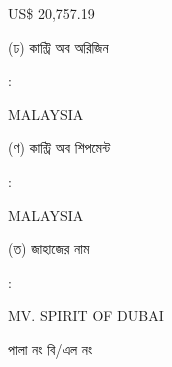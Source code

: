 \documentclass[12pt]{article}
\newcommand{\price}{US\$ 20,757.19}
\newcommand{\co}{MALAYSIA}
\newcommand{\coship}{MALAYSIA}
\newcommand{\vessel}{MV. SPIRIT OF DUBAI}
\begin{document}
\begin{minipage}[t]{0.50\linewidth}
{\price}
\\
\end{minipage}
\begin{minipage}[t]{0.05\linewidth}
\hspace*{1em}
\end{minipage}
\begin{minipage}[t]{0.45\linewidth}
(ঢ) কান্ট্রি অব অরিজিন
\end{minipage}
\begin{minipage}[t]{0.02\linewidth}
:
\end{minipage}
\begin{minipage}[t]{0.50\linewidth}
{\co}
\\
\end{minipage}
\begin{minipage}[t]{0.05\linewidth}
\hspace*{1em}
\end{minipage}
\begin{minipage}[t]{0.45\linewidth}
(ণ) কান্ট্রি অব শিপমেন্ট
\end{minipage}
\begin{minipage}[t]{0.02\linewidth}
:
\end{minipage}
\begin{minipage}[t]{0.50\linewidth}
{\coship}
\\
\end{minipage}
\begin{minipage}[t]{0.05\linewidth}
\hspace*{1em}
\end{minipage}
\begin{minipage}[t]{0.45\linewidth}
(ত) জাহাজের নাম
\end{minipage}
\begin{minipage}[t]{0.02\linewidth}
:
\end{minipage}
\begin{minipage}[t]{0.50\linewidth}
{\vessel}
\end{minipage}
\begin{minipage}[t]{0.05\linewidth}
\hspace*{1em}
\end{minipage}
\begin{minipage}[t]{0.45\linewidth}
\hspace*{1.8em}পালা নং বি/এল নং
\end{minipage}
\begin{minipage}[t]{0.02\linewidth}
\hspace{1em}
\end{minipage}
\end{document}

